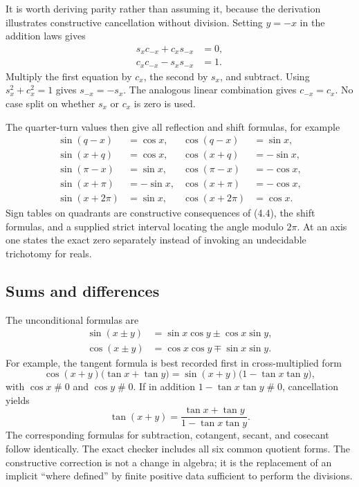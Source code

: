 \documentclass[11pt]{article}
\theoremstyle{definition}
\newcommand{\apart}{\mathrel{\#}}
\begin{document}
It is worth deriving parity rather than assuming it, because the derivation
illustrates constructive cancellation without division.  Setting \(y=-x\) in
the addition laws gives
\begin{align*}
 s_xc_{-x}+c_xs_{-x}&=0,\\
 c_xc_{-x}-s_xs_{-x}&=1.
\end{align*}
Multiply the first equation by \(c_x\), the second by \(s_x\), and subtract.
Using \(s_x^2+c_x^2=1\) gives \(s_{-x}=-s_x\).  The analogous linear
combination gives \(c_{-x}=c_x\).  No case split on whether \(s_x\) or \(c_x\)
is zero is used.

The quarter-turn values then give all reflection and shift formulas, for example
\begin{align}
 \sin(q-x)&=\cos x,& \cos(q-x)&=\sin x,\tag{6.3}\\
 \sin(x+q)&=\cos x,& \cos(x+q)&=-\sin x,\tag{6.4}\\
 \sin(\pi-x)&=\sin x,& \cos(\pi-x)&=-\cos x,\tag{6.5}\\
 \sin(x+\pi)&=-\sin x,& \cos(x+\pi)&=-\cos x,\tag{6.6}\\
 \sin(x+2\pi)&=\sin x,& \cos(x+2\pi)&=\cos x.\tag{6.7}
\end{align}
Sign tables on quadrants are constructive consequences of (4.4), the shift
formulas, and a supplied strict interval locating the angle modulo \(2\pi\).
At an axis one states the exact zero separately instead of invoking an
undecidable trichotomy for reals.

\subsection{Sums and differences}

The unconditional formulas are
\begin{align}
 \sin(x\pm y)&=\sin x\cos y\pm\cos x\sin y,\tag{6.8}\\
 \cos(x\pm y)&=\cos x\cos y\mp\sin x\sin y.\tag{6.9}
\end{align}
For example, the tangent formula is best recorded first in cross-multiplied
form
\[
 \cos(x+y)\bigl(\tan x+\tan y\bigr)
 =\sin(x+y)\bigl(1-\tan x\tan y\bigr),
 \tag{6.10}
\]
with \(\cos x\apart0\) and \(\cos y\apart0\).  If in addition
\(1-\tan x\tan y\apart0\), cancellation yields
\[
 \tan(x+y)=\frac{\tan x+\tan y}{1-\tan x\tan y}.
 \tag{6.11}
\]
The corresponding formulas for subtraction, cotangent, secant, and cosecant
follow identically.  The exact checker includes all six common quotient forms.
The constructive correction is not a change in algebra; it is the replacement
of an implicit ``where defined'' by finite positive data sufficient to perform
the divisions.
\end{document}

